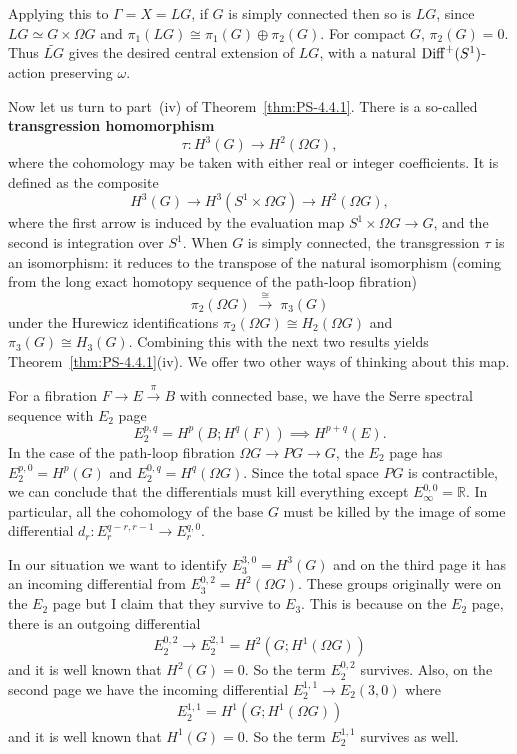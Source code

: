 \documentclass[12pt]{article}
\begin{document}
Applying this to $\Gamma = X = LG$, if $G$ is simply connected then so is $LG$, since $LG\simeq G\times\Omega G$ and $\pi_1(LG)\cong\pi_1(G)\oplus\pi_2(G)$. For compact $G$, $\pi_2(G)=0$. Thus $\widetilde{LG}$ gives the desired central extension of $LG$, with a natural $\operatorname{Diff}^+(S^1)$-action preserving $\omega$.

Now let us turn to part~(iv) of Theorem~\ref{thm:PS-4.4.1}. There is a so-called \textbf{transgression homomorphism}
\begin{equation}\label{eq:transgression}
    \tau : H^3(G) \longrightarrow H^2(\Omega G),
\end{equation}
where the cohomology may be taken with either real or integer coefficients. It is defined as the composite
\[
    H^3(G) \longrightarrow H^3(S^1 \times \Omega G) \longrightarrow H^2(\Omega G),
\]
where the first arrow is induced by the evaluation map $S^1\times \Omega G \to G$, and the second is integration over $S^1$. When $G$ is simply connected, the transgression $\tau$ is an isomorphism: it reduces to the transpose of the natural isomorphism (coming from the long exact homotopy sequence of the path-loop fibration)
\[
    \pi_2(\Omega G) \;\xrightarrow{\;\cong\;}\; \pi_3(G)
\]
under the Hurewicz identifications $\pi_2(\Omega G) \cong H_2(\Omega G)$ and $\pi_3(G) \cong H_3(G)$. Combining this with the next two results yields Theorem~\ref{thm:PS-4.4.1}(iv). We offer two other ways of thinking about this map.

\begin{remark}
    For a fibration $F \to E \xrightarrow{\pi} B$ with connected base, we have the Serre spectral sequence with $E_2$ page
    \[
        E_2^{p,q} = H^p(B; H^q(F)) \implies H^{p+q}(E).
    \]
    In the case of the path-loop fibration $\Omega G \to PG \to G$, the $E_2$ page has $E_2^{p,0} = H^p(G)$ and $E_2^{0,q} = H^q(\Omega G)$. Since the total space $PG$ is contractible, we can conclude that the differentials must kill everything except $E_\infty^{0,0} = \mathbb{R}$. In particular, all the cohomology of the base $G$ must be killed by the image of some differential $d_r: E_r^{q-r,r-1} \to E_r^{q,0}$.

    In our situation we want to identify $E_3^{3,0} = H^3(G)$ and on the third page it has an incoming differential from $E_3^{0,2} = H^2(\Omega G)$. These groups originally were on the $E_2$ page but I claim that they survive to $E_3$. This is because on the $E_2$ page, there is an outgoing differential \begin{align*}
        E_2^{0,2} \to E_2^{2,1} = H^2(G; H^1(\Omega G))
    \end{align*}
    and it is well known that $H^2(G) = 0$. So the term $E_2^{0,2}$ survives. Also, on the second page we have the incoming differential $E_2^{1,1} \to E_2(3,0)$ where \begin{align*}
        E_2^{1,1} = H^1(G; H^1(\Omega G))
    \end{align*} and it is well known that $H^1(G) = 0$. So the term $E_2^{1,1}$ survives as well.
\end{remark}
\end{document}
